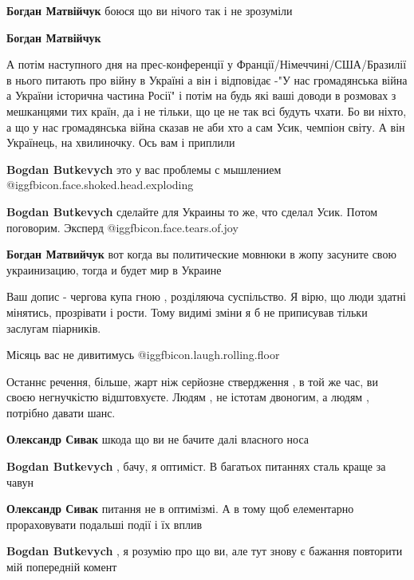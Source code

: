\begin{itemize}
\begin{itemize}
\textbf{Богдан Матвійчук} боюся що ви нічого так і не зрозуміли

\textbf{Богдан Матвійчук} 

А потім наступного дня на прес-конференції у Франції/Німеччині/США/Бразилії в
нього питають про війну в Україні а він і відповідає -"У нас громадянська війна
а України історична частина Росії" і потім на будь які ваші доводи в розмовах з
мешканцями тих країн, да і не тільки, що це не так всі будуть чхати. Бо ви
ніхто, а що у нас громадянська війна сказав не аби хто а сам Усик, чемпіон
світу. А він Українець, на хвилиночку. Ось вам і приплили

\textbf{Bogdan Butkevych} это у вас проблемы с мышлением  @igg{fbicon.face.shoked.head.exploding} 

\textbf{Bogdan Butkevych} сделайте для Украины то же, что сделал Усик. Потом поговорим. Эксперд  @igg{fbicon.face.tears.of.joy} 

\textbf{Богдан Матвийчук} вот когда вы политические мовнюки в жопу засуните свою украинизацию, тогда и будет мир в Украине

\end{itemize} %


Ваш допис - чергова купа гною , розділяюча суспільство. Я вірю, що люди здатні
мінятись, прозрівати і рости. Тому видимі зміни я б не приписував тільки
заслугам піарників.

Місяць вас не дивитимусь  @igg{fbicon.laugh.rolling.floor} 

Останнє речення, більше, жарт ніж серйозне ствердження , в той же час, ви своєю
негнучкістю відштовхуєте. Людям , не істотам двоногим, а людям , потрібно
давати шанс.

\begin{itemize} %
\textbf{Олександр Сивак} шкода що ви не бачите далі власного носа

\textbf{Bogdan Butkevych} , бачу, я оптиміст. В багатьох питаннях сталь краще за чавун


\textbf{Олександр Сивак} питання не в оптимізмі. А в тому щоб елементарно прораховувати подальші події і їх вплив

\textbf{Bogdan Butkevych} , я розумію про що ви, але тут знову є бажання повторити мій попередній комент



\end{itemize}
\end{itemize}
